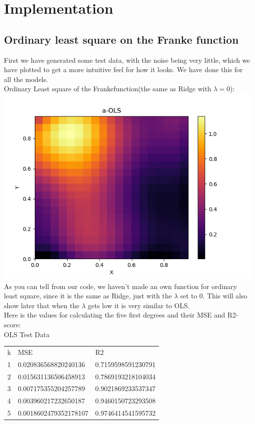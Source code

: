 \documentclass[a4paper,norsk]{article}
\begin{document}
\section{Implementation}
\subsection{Ordinary least square on the Franke function}

First we have generated some test data, with the noise being very little, which we have plotted to get a more intuitive feel for how it looks. We have done this for all the models.
\\Ordinary Least square of the Frankefunction(the same as Ridge with $\lambda=0$):
\\ \includegraphics[scale=.7]{a-OLS}
\\As you can tell from our code, we haven't made an own function for ordinary least square, since it is the same as Ridge, just with the $\lambda$ set to 0. This will also show later that when the $\lambda$ gets low it is very similar to OLS.
\\Here is the values for calculating the five first degrees and their MSE and  R2-score:
\\OLS Test Data
\begin{table}[!h]
\begin{tabular}{lll}
k & MSE                   & R2                 \\
1 & 0.020836568820240136  & 0.7159598591230791 \\
2 & 0.015631136506458913  & 0.7869193218104034 \\
3 & 0.007175355204257789  & 0.9021869233537347 \\
4 & 0.003960217232650187  & 0.9460150723293508 \\
5 & 0.0018602479352178107 & 0.9746414541595732
\end{tabular}
\end{table}
\end{document}

